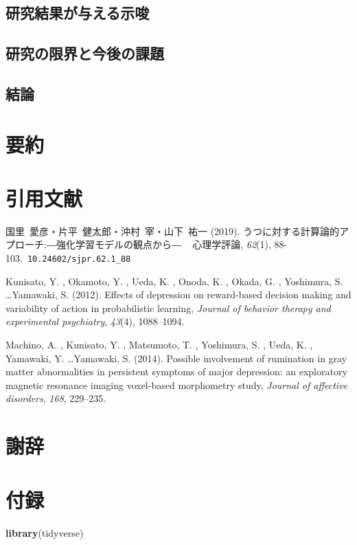 \documentclass[12pt,a4paper,xelatex,ja=standard]{bxjsarticle}
\newenvironment{Shaded}{\begin{snugshade}}{\end{snugshade}}
\newcommand{\FunctionTok}[1]{\textcolor[rgb]{0.13,0.29,0.53}{\textbf{#1}}}
\newcommand{\NormalTok}[1]{#1}
\begin{document}
\subsection{研究結果が与える示唆}\label{ux7814ux7a76ux7d50ux679cux304cux4e0eux3048ux308bux793aux5506}

\subsection{研究の限界と今後の課題}\label{ux7814ux7a76ux306eux9650ux754cux3068ux4ecaux5f8cux306eux8ab2ux984c}

\subsection{結論}\label{ux7d50ux8ad6}

\clearpage

\section{要約}\label{ux8981ux7d04}

\clearpage

\section{引用文献}\label{ux5f15ux7528ux6587ux732e}

\noindent \begingroup \setlength{\parindent}{-0.3in}
\setlength{\leftskip}{0.2in} \setlength{\parskip}{8pt}

国里~愛彦・片平~健太郎・沖村~宰・山下~祐一 (2019).
うつに対する計算論的アプローチ:―強化学習モデルの観点から― ~ 心理学評論,
\emph{62}(1), 88-103.~\verb|10.24602/sjpr.62.1_88|

Kunisato, Y. , Okamoto, Y. , Ueda, K. , Onoda, K. , Okada, G. ,
Yoshimura, S. \ldots Yamawaki, S. (2012). Effects of depression on
reward-based decision making and variability of action in probabilistic
learning,
\emph{Journal of behavior therapy and experimental psychiatry},
\emph{43}(4), 1088--1094.

Machino, A. , Kunisato, Y. , Matsumoto, T. , Yoshimura, S. , Ueda, K. ,
Yamawaki, Y. \ldots Yamawaki, S. (2014). Possible involvement of
rumination in gray matter abnormalities in persistent symptoms of major
depression: an exploratory magnetic resonance imaging voxel-based
morphometry study, \emph{Journal of affective disorders}, \emph{168},
229--235.

\endgroup

\clearpage

\section{謝辞}\label{ux8b1dux8f9e}

\clearpage

\section{付録}\label{ux4ed8ux9332}

\begin{Shaded}
\begin{Highlighting}[]
\FunctionTok{library}\NormalTok{(tidyverse)}
\end{Highlighting}
\end{Shaded}
\end{document}

